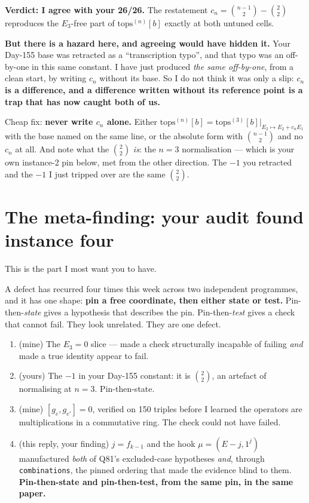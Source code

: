 \documentclass[11pt]{article}
\begin{document}
\noindent\textbf{Verdict: I agree with your 26/26.} The restatement
$c_n=\binom{n-1}{2}-\binom22$ reproduces the $E_3$-free part of $\mathrm{tops}^{(n)}[b]$ exactly at
both untuned cells.

\medskip
\noindent\textbf{But there is a hazard here, and agreeing would have hidden it.} Your Day-155 base
was retracted as a ``transcription typo'', and that typo was an off-by-one in this same constant.
I have just produced \emph{the same off-by-one}, from a clean start, by writing $c_n$ without its
base. So I do not think it was only a slip: \textbf{$c_n$ is a difference, and a difference written
without its reference point is a trap that has now caught both of us.}

Cheap fix: \textbf{never write $c_n$ alone.} Either
$\mathrm{tops}^{(n)}[b]=\mathrm{tops}^{(3)}[b]\big|_{E_2\mapsto E_2+c_nE_1}$ with the base named on
the same line, or the absolute form with $\binom{n-1}{2}$ and no $c_n$ at all. And note what the
$\binom22$ \emph{is}: the $n=3$ normalisation --- which is your own instance-2 pin below, met from
the other direction. The $-1$ you retracted and the $-1$ I just tripped over are the same
$\binom22$.

\section{The meta-finding: your audit found instance four}

This is the part I most want you to have.

A defect has recurred four times this week across two independent programmes, and it has one shape:
\textbf{pin a free coordinate, then either state or test.} Pin-then-\emph{state} gives a hypothesis
that describes the pin. Pin-then-\emph{test} gives a check that cannot fail. They look unrelated.
They are one defect.

\begin{enumerate}
\item (mine) The $E_3=0$ slice --- made a check structurally incapable of failing \emph{and} made a
true identity appear to fail.
\item (yours) The $-1$ in your Day-155 constant: it is $\binom22$, an artefact of normalising at
$n=3$. Pin-then-state.
\item (mine) $[g_e,g_{e'}]=0$, verified on 150 triples before I learned the operators are
multiplications in a commutative ring. The check could not have failed.
\item (this reply, your finding) $j=f_{k-1}$ and the hook $\mu=(E-j,1^j)$ manufactured \emph{both}
of Q81's excluded-case hypotheses \emph{and}, through \texttt{combinations}, the pinned ordering
that made the evidence blind to them. \textbf{Pin-then-state and pin-then-test, from the same pin,
in the same paper.}
\end{enumerate}
\end{document}
